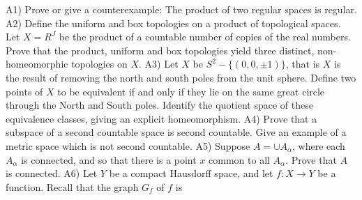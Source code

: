 \documentclass[14pt]{extarticle}
\begin{document}
\newpage
A1) Prove or give a counterexample: The product of two regular spaces is regular.
\newpage
A2) Define the uniform and box topologies on a product of topological spaces. Let $X=R^{J}$ be the product of a countable number of copies of the real numbers. Prove that the product, uniform and box topologies yield three distinct, non-homeomorphic topologies on $X$.
\newpage
A3) Let $X$ be $S^{2}-\{(0,0, \pm 1)\}$, that is $X$ is the result of removing the north and south poles from the unit sphere. Define two points of $X$ to be equivalent if and only if they lie on the same great circle through the North and South poles. Identify the quotient space of these equivalence classes, giving an explicit homeomorphism.
\newpage
A4) Prove that a subspace of a second countable space is second countable. Give an example of a metric space which is not second countable.
\newpage
A5) Suppose $A=\cup A_{\alpha}$, where each $A_{\alpha}$ is connected, and so that there is a point $x$ common to all $A_{\alpha}$. Prove that $A$ is connected.
\newpage
A6) Let $Y$ be a compact Hausdorff space, and let $f: X \rightarrow Y$ be a function. Recall that the graph $G_{f}$ of $f$ is
\end{document}
